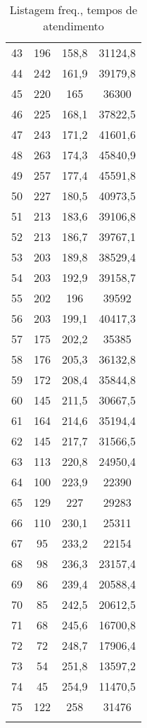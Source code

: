 \begin{longtable}[htpb]{@{}cccc@{}}
43 & 196  & 158,8 & 31124,8 \\ 
44 & 242  & 161,9 & 39179,8 \\ 
45 & 220  & 165   & 36300   \\ 
46 & 225  & 168,1 & 37822,5 \\ 
47 & 243  & 171,2 & 41601,6 \\ 
48 & 263  & 174,3 & 45840,9 \\ 
49 & 257  & 177,4 & 45591,8 \\ 
50 & 227  & 180,5 & 40973,5 \\ 
51 & 213  & 183,6 & 39106,8 \\ 
52 & 213  & 186,7 & 39767,1 \\ 
53 & 203  & 189,8 & 38529,4 \\ 
54 & 203  & 192,9 & 39158,7 \\ 
55 & 202  & 196   & 39592   \\ 
56 & 203  & 199,1 & 40417,3 \\ 
57 & 175  & 202,2 & 35385   \\ 
58 & 176  & 205,3 & 36132,8 \\ 
59 & 172  & 208,4 & 35844,8 \\ 
60 & 145  & 211,5 & 30667,5 \\ 
61 & 164  & 214,6 & 35194,4 \\ 
62 & 145  & 217,7 & 31566,5 \\ 
63 & 113  & 220,8 & 24950,4 \\ 
64 & 100  & 223,9 & 22390   \\ 
65 & 129  & 227   & 29283   \\ 
66 & 110  & 230,1 & 25311   \\ 
67 & 95   & 233,2 & 22154   \\ 
68 & 98   & 236,3 & 23157,4 \\ 
69 & 86   & 239,4 & 20588,4 \\ 
70 & 85   & 242,5 & 20612,5 \\ 
71 & 68   & 245,6 & 16700,8 \\ 
72 & 72   & 248,7 & 17906,4 \\ 
73 & 54   & 251,8 & 13597,2 \\ 
74 & 45   & 254,9 & 11470,5 \\ 
75 & 122  & 258   & 31476   \\ \bottomrule
\caption{Listagem freq., tempos de atendimento}
\label{tab:tabela6}
\end{longtable}

